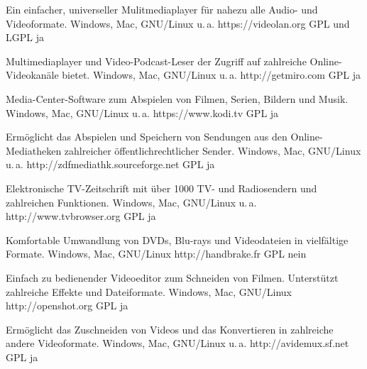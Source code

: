 




{Ein einfacher, universeller Mulitmediaplayer für nahezu alle Audio- und Videoformate.}
{Windows, Mac, GNU/Linux u.\,a.}
{https://videolan.org}
{GPL und LGPL}
{ja}

{Multimediaplayer und Video-Podcast-Leser der Zugriff auf zahlreiche Online-Videokanäle bietet.}
{Windows, Mac, GNU/Linux u.\,a.}
{http://getmiro.com}
{GPL}
{ja}

{Media-Center-Software zum Abspielen von Filmen, Serien, Bildern und Musik.}
{Windows, Mac, GNU/Linux u.\,a.}
{https://www.kodi.tv}
{GPL}
{ja}

{Ermöglicht das Abspielen und Speichern von Sendungen aus den Online-Mediatheken zahlreicher öffentlichrechtlicher Sender.}
{Windows, Mac, GNU/Linux u.\,a.}
{http://zdfmediathk.sourceforge.net}
{GPL}
{ja}


{Elektronische TV-Zeitschrift mit über 1000 TV- und Radiosendern und zahlreichen Funktionen.}
{Windows, Mac, GNU/Linux u.\,a.}
{http://www.tvbrowser.org}
{GPL}
{ja}

{Komfortable Umwandlung von DVDs, Blu-rays und Videodateien in vielfältige Formate.}
{Windows, Mac, GNU/Linux}
{http://handbrake.fr}
{GPL}
{nein}

{Einfach zu bedienender Videoeditor zum Schneiden von Filmen. Unterstützt zahlreiche Effekte und Dateiformate.}
{Windows, Mac, GNU/Linux}
{http://openshot.org}
{GPL}
{ja}

{Ermöglicht das Zuschneiden von Videos und das Konvertieren in zahlreiche andere Videoformate.}
{Windows, Mac, GNU/Linux u.\,a.}
{http://avidemux.sf.net}
{GPL}
{ja}

\backpage

